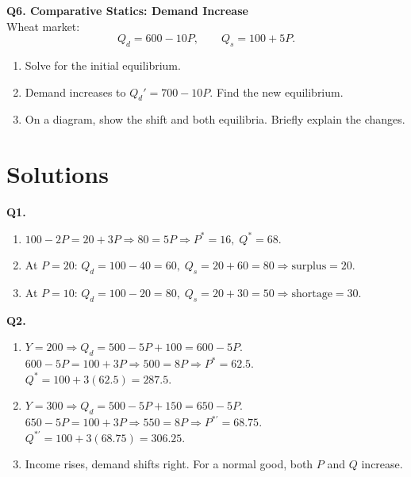 \documentclass[11pt]{article}
\begin{document}
\bigskip

\noindent  \textbf{Q6. Comparative Statics: Demand Increase}\\
Wheat market:
\[
Q_d = 600 - 10P, \qquad Q_s = 100 + 5P.
\]
\begin{enumerate}[label=(\alph*)]
\item Solve for the initial equilibrium.
\item Demand increases to $Q_d' = 700 - 10P$. Find the new equilibrium.
\item On a diagram, show the shift and both equilibria. Briefly explain the changes.
\end{enumerate}

\begin{center}
\end{center}

\newpage
\section*{Solutions}

\textbf{Q1.}
\begin{enumerate}[label=(\alph*)]
\item $100-2P=20+3P \Rightarrow 80=5P \Rightarrow P^\ast=16,\; Q^\ast=68.$
\item At $P=20$: $Q_d=100-40=60,\; Q_s=20+60=80 \Rightarrow \text{surplus}=20.$
\item At $P=10$: $Q_d=100-20=80,\; Q_s=20+30=50 \Rightarrow \text{shortage}=30.$
\end{enumerate}

\bigskip

\textbf{Q2.}
\begin{enumerate}[label=(\alph*)]
\item $Y=200 \Rightarrow Q_d=500-5P+100=600-5P.$\\
$600-5P=100+3P \Rightarrow 500=8P \Rightarrow P^\ast=62.5.$\\
$Q^\ast=100+3(62.5)=287.5.$
\item $Y=300 \Rightarrow Q_d=500-5P+150=650-5P.$\\
$650-5P=100+3P \Rightarrow 550=8P \Rightarrow P^{\ast\prime}=68.75.$\\
$Q^{\ast\prime}=100+3(68.75)=306.25.$
\item Income rises, demand shifts right. For a normal good, both $P$ and $Q$ increase.
\end{enumerate}
\end{document}
